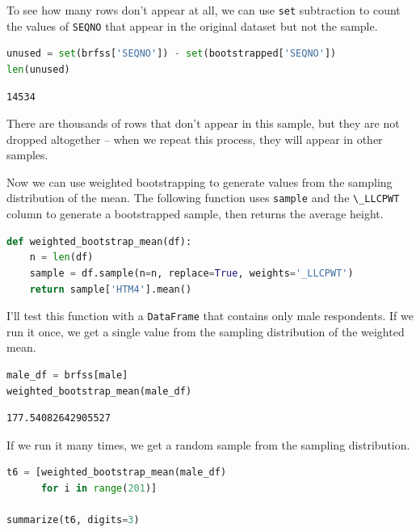 To see how many rows don't appear at all, we can use
\passthrough{\lstinline!set!} subtraction to count the values of
\passthrough{\lstinline!SEQNO!} that appear in the original dataset but
not the sample.

\begin{lstlisting}[language=Python,style=source]
unused = set(brfss['SEQNO']) - set(bootstrapped['SEQNO'])
len(unused)
\end{lstlisting}

\begin{lstlisting}[style=output]
14534
\end{lstlisting}

There are thousands of rows that don't appear in this sample, but they
are not dropped altogether -- when we repeat this process, they will
appear in other samples.

Now we can use weighted bootstrapping to generate values from the
sampling distribution of the mean. The following function uses
\passthrough{\lstinline!sample!} and the
\passthrough{\lstinline!\_LLCPWT!} column to generate a bootstrapped
sample, then returns the average height.

\begin{lstlisting}[language=Python,style=source]
def weighted_bootstrap_mean(df):
    n = len(df)
    sample = df.sample(n=n, replace=True, weights='_LLCPWT')
    return sample['HTM4'].mean()
\end{lstlisting}

I'll test this function with a \passthrough{\lstinline!DataFrame!} that
contains only male respondents. If we run it once, we get a single value
from the sampling distribution of the weighted mean.

\begin{lstlisting}[language=Python,style=source]
male_df = brfss[male]
weighted_bootstrap_mean(male_df)
\end{lstlisting}

\begin{lstlisting}[style=output]
177.54082642905527
\end{lstlisting}

If we run it many times, we get a random sample from the sampling
distribution.

\begin{lstlisting}[language=Python,style=source]
t6 = [weighted_bootstrap_mean(male_df) 
      for i in range(201)]

summarize(t6, digits=3)
\end{lstlisting}


